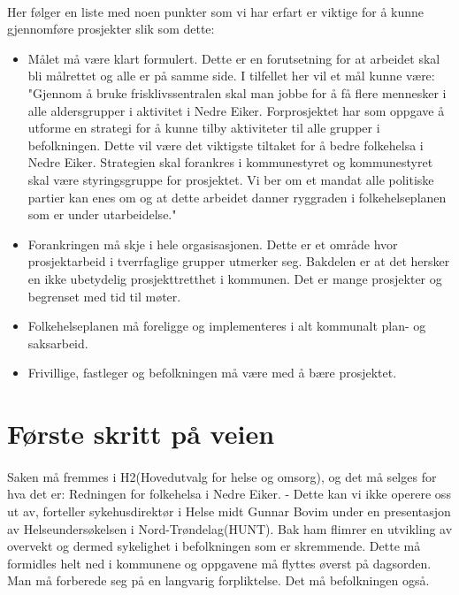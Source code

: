 \documentclass[11pt]{memoir} %
\begin{document}
		\paragraph{}
			Her følger en liste med noen punkter som vi har erfart er viktige for å kunne gjennomføre prosjekter slik som dette:
				\begin{itemize}
					\item Målet må være klart formulert. Dette er en forutsetning for at arbeidet skal bli målrettet og alle er på samme side. I tilfellet her vil et mål kunne være: "Gjennom å bruke frisklivssentralen skal man jobbe for å få flere mennesker i alle aldersgrupper i aktivitet i Nedre Eiker. Forprosjektet har som oppgave å utforme en strategi for å kunne tilby aktiviteter til alle grupper i befolkningen. Dette vil være det viktigste tiltaket for å bedre folkehelsa i Nedre Eiker. Strategien skal forankres i kommunestyret og kommunestyret skal være styringsgruppe for prosjektet. Vi ber om et mandat alle politiske partier kan enes om og at dette arbeidet danner ryggraden i folkehelseplanen som er under utarbeidelse."\\
					\item Forankringen må skje i hele orgasisasjonen. Dette er et område hvor prosjektarbeid i tverrfaglige grupper utmerker seg. Bakdelen er at det hersker en ikke ubetydelig prosjekttretthet i kommunen. Det er mange prosjekter og begrenset med tid til møter.\\
					\item Folkehelseplanen må foreligge og implementeres i alt kommunalt plan- og saksarbeid.\\
					\item Frivillige, fastleger og befolkningen må være med å bære prosjektet.\\
				\end{itemize}
	\section{Første skritt på veien}
		\paragraph{}
			Saken må fremmes i H2(Hovedutvalg for helse og omsorg), og det må selges for hva det er: Redningen for folkehelsa i Nedre Eiker. - Dette kan vi ikke operere oss ut av, forteller sykehusdirektør i Helse midt Gunnar Bovim under en presentasjon av Helseundersøkelsen i Nord-Trøndelag(HUNT). Bak ham flimrer en utvikling av overvekt og dermed sykelighet i befolkningen som er skremmende. Dette må formidles helt ned i kommunene og oppgavene må flyttes øverst på dagsorden. Man må forberede seg på en langvarig forpliktelse. Det må befolkningen også.
\end{document}
